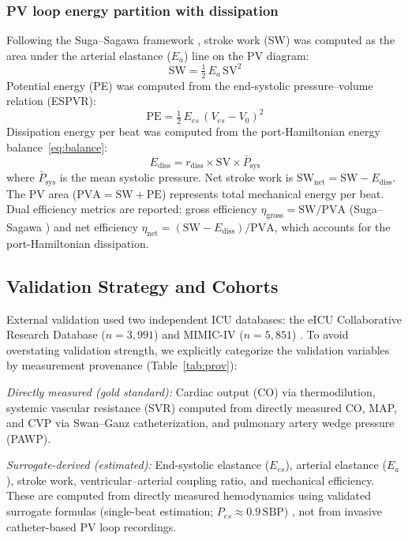 \documentclass[journal]{IEEEtran}
\begin{document}
\subsubsection{PV loop energy partition with dissipation}\label{sec:pv}
Following the Suga--Sagawa framework \cite{suga1974}, stroke work (SW) was computed as the area under the arterial elastance ($E_a$) line on the PV diagram:
\begin{equation}\label{eq:sw}
\text{SW} = \tfrac{1}{2}\, E_a \,\text{SV}^2
\end{equation}
Potential energy (PE) was computed from the end-systolic pressure--volume relation (ESPVR):
\begin{equation}\label{eq:pe}
\text{PE} = \tfrac{1}{2}\, E_{es}\,(V_{es} - V_0)^2
\end{equation}
Dissipation energy per beat was computed from the port-Hamiltonian energy balance~\eqref{eq:balance}:
\begin{equation}\label{eq:ediss}
E_{\text{diss}} = r_{\text{diss}} \times \text{SV} \times \bar{P}_{\text{sys}}
\end{equation}
where $\bar{P}_{\text{sys}}$ is the mean systolic pressure. Net stroke work is $\text{SW}_{\text{net}}=\text{SW}-E_{\text{diss}}$. The PV area ($\text{PVA}=\text{SW}+\text{PE}$) represents total mechanical energy per beat. Dual efficiency metrics are reported: gross efficiency $\eta_{\text{gross}}=\text{SW}/\text{PVA}$ (Suga--Sagawa \cite{suga1974}) and net efficiency $\eta_{\text{net}}=(\text{SW}-E_{\text{diss}})/\text{PVA}$, which accounts for the port-Hamiltonian dissipation.

\subsection{Validation Strategy and Cohorts}\label{sec:val}
External validation used two independent ICU databases: the eICU Collaborative Research Database ($n=3{,}991$) and MIMIC-IV ($n=5{,}851$) \cite{johnson2023,johnson2016,pollard2018}. To avoid overstating validation strength, we explicitly categorize the validation variables by measurement provenance (Table~\ref{tab:prov}):

\emph{Directly measured (gold standard):} Cardiac output (CO) via thermodilution, systemic vascular resistance (SVR) computed from directly measured CO, MAP, and CVP via Swan--Ganz catheterization, and pulmonary artery wedge pressure (PAWP).

\emph{Surrogate-derived (estimated):} End-systolic elastance ($E_{es}$), arterial elastance ($E_a$), stroke work, ventricular--arterial coupling ratio, and mechanical efficiency. These are computed from directly measured hemodynamics using validated surrogate formulas (single-beat estimation; $P_{es}\approx0.9\,\text{SBP}$) \cite{chen2001}, not from invasive catheter-based PV loop recordings.
\end{document}
